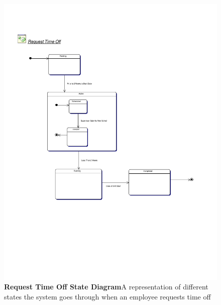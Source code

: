 \documentclass[letterpaper,12pt]{report}
\begin{document}
\begin{figure}[htp]
 \includegraphics[scale=0.8,trim=15mm 70mm 25mm 20mm]{diagrams/reqtimeoff.pdf}
 \caption{\small
\textbf{Request Time Off State Diagram}\newline A representation of different states the system goes through when an employee requests time off}\label{fig:state3}
\end{figure}
\pagebreak
\end{document}
